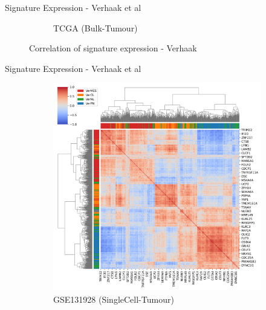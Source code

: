 \documentclass[aspectratio=169,9pt]{beamer}
\begin{document}
\begin{frame}{Signature Expression - Verhaak et al}
\begin{adjustwidth}{-5cm}{-5cm}
\begin{figure}
\begin{subfigure}[c]{0.48\textwidth}
                    \caption{TCGA (Bulk-Tumour)}
                \end{subfigure}
                \caption{Correlation of signature expression - Verhaak}
            \end{figure}
        \end{adjustwidth}
    \end{frame}

    \begin{frame}{Signature Expression - Verhaak et al}
        \begin{adjustwidth}{-5cm}{-5cm}
            \centering
            \begin{figure}\ContinuedFloat
                \centering
                \begin{subfigure}[c]{0.48\textwidth}
                    \centering
                    \includegraphics[width=\textwidth]{GSM3828672_Corrplot_Ver}
                    \caption{GSE131928 (SingleCell-Tumour)}
                \end{subfigure}
                \begin{subfigure}[c]{0.48\textwidth}
                    \centering

\end{subfigure}
\end{figure}
\end{adjustwidth}
\end{frame}
\end{document}
